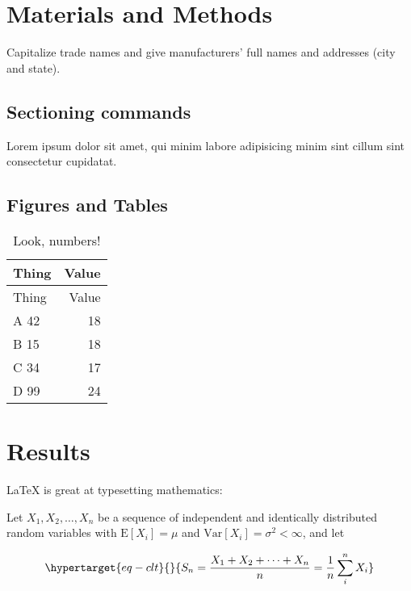 \documentclass[
  twocolumn]{biophys-new-mod}
\begin{document}
\hypertarget{materials-and-methods}{%
\section{Materials and Methods}\label{materials-and-methods}}

Capitalize trade names and give manufacturers' full names and addresses
(city and state).

\hypertarget{sectioning-commands}{%
\subsection{Sectioning commands}\label{sectioning-commands}}

Lorem ipsum dolor sit amet, qui minim labore adipisicing minim sint
cillum sint consectetur cupidatat.

\hypertarget{figures-and-tables}{%
\subsection{Figures and Tables}\label{figures-and-tables}}

\hypertarget{tbl-numbers}{}
\begin{longtable}[]{@{}lr@{}}
\caption{\label{tbl-numbers}Look, numbers!}\tabularnewline
\toprule()
Thing & Value \\
\midrule()
\endfirsthead
\toprule()
Thing & Value \\
\midrule()
\endhead
A 42 & 18 \\
B 15 & 18 \\
C 34 & 17 \\
D 99 & 24 \\
\bottomrule()
\end{longtable}

\hypertarget{results}{%
\section{Results}\label{results}}

LaTeX is great at typesetting mathematics:

Let \(X_1, X_2, \ldots, X_n\) be a sequence of independent and
identically distributed random variables with \(\text{E}[X_i] = \mu\)
and \(\text{Var}[X_i] = \sigma^2 < \infty\), and let

\begin{equation}\protect\hypertarget{eq-clt}{}{
S_n = \frac{X_1 + X_2 + \cdots + X_n}{n}
      = \frac{1}{n}\sum_{i}^{n} X_i
}\label{eq-clt}\end{equation}
\end{document}
